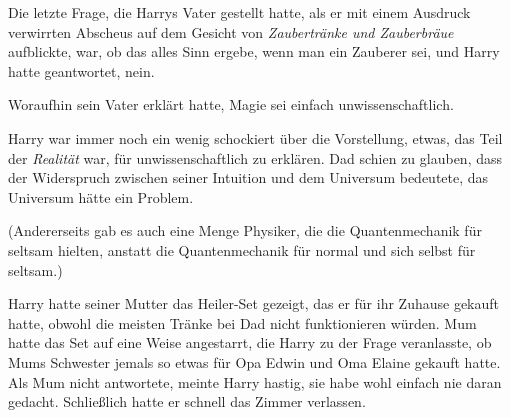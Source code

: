 Die letzte Frage, die Harrys Vater gestellt hatte, als er mit einem Ausdruck verwirrten Abscheus auf dem Gesicht von \emph{Zaubertränke und Zauberbräue} aufblickte, war, ob das alles Sinn ergebe, wenn man ein Zauberer sei, und Harry hatte geantwortet, nein.

Woraufhin sein Vater erklärt hatte, Magie sei einfach unwissenschaftlich.

Harry war immer noch ein wenig schockiert über die Vorstellung, etwas, das Teil der \emph{Realität} war, für unwissenschaftlich zu erklären. Dad schien zu glauben, dass der Widerspruch zwischen seiner Intuition und dem Universum bedeutete, das Universum hätte ein Problem.

(Andererseits gab es auch eine Menge Physiker, die die Quantenmechanik für seltsam hielten, anstatt die Quantenmechanik für normal und sich selbst für seltsam.)

Harry hatte seiner Mutter das Heiler-Set gezeigt, das er für ihr Zuhause gekauft hatte, obwohl die meisten Tränke bei Dad nicht funktionieren würden. Mum hatte das Set auf eine Weise angestarrt, die Harry zu der Frage veranlasste, ob Mums Schwester jemals so etwas für Opa Edwin und Oma Elaine gekauft hatte. Als Mum nicht antwortete, meinte Harry hastig, sie habe wohl einfach nie daran gedacht. Schließlich hatte er schnell das Zimmer verlassen.

